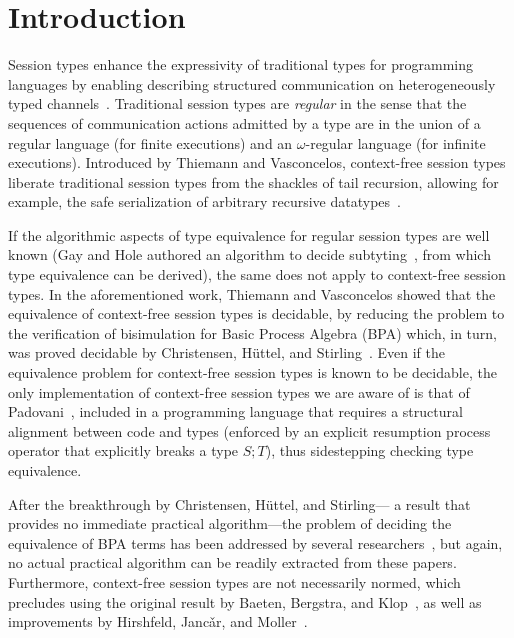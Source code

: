 \section{Introduction}
\label{sec:introduction}

Session types enhance the expressivity of traditional types for
programming languages by enabling describing structured communication
on heterogeneously typed
channels~\cite{DBLP:conf/concur/Honda93,DBLP:conf/esop/HondaVK98,DBLP:conf/parle/TakeuchiHK94}.
%
Traditional session types are \emph{regular} in the sense that the
sequences of communication actions admitted by a type are in the union
of a regular language (for finite executions) and an $\omega$-regular
language (for infinite executions).
%
Introduced by Thiemann and Vasconcelos, context-free session types
liberate traditional session types from the shackles of tail
recursion, allowing for example, the safe serialization of arbitrary
recursive datatypes~\cite{thiemann2016context}.

If the algorithmic aspects of type equivalence for regular session
types are well known (Gay and Hole authored an algorithm to decide
subtyting~\cite{DBLP:journals/acta/GayH05}, from which type
equivalence can be derived), the same does not apply to context-free
session types.
%
In the aforementioned work, Thiemann and Vasconcelos showed that the
equivalence of context-free session types is decidable, by reducing
the problem to the verification of bisimulation for Basic Process
Algebra (BPA) which, in turn, was proved decidable by Christensen,
H{\"{u}}ttel, and Stirling~\cite{DBLP:journals/iandc/ChristensenHS95}.
%
Even if the equivalence problem for context-free session types is
known to be decidable, the only implementation of context-free session
types we are aware of is that of
Padovani~\cite{DBLP:conf/esop/Padovani17}, included in a programming
language that requires a structural alignment between code and types
(enforced by an explicit resumption process operator that explicitly
breaks a type $S;T$), thus sidestepping checking type equivalence.

After the breakthrough by Christensen, H\"uttel, and Stirling--- a
result that provides no immediate practical algorithm---the problem of
deciding the equivalence of BPA terms has been addressed by several
researchers~\cite{DBLP:conf/mfcs/BurkartCS95,DBLP:journals/iandc/ChristensenHS95,janvcar1999techniques},
but again, no actual practical algorithm can be readily extracted from
these papers.
%
Furthermore, context-free session types are not necessarily normed,
which precludes using the original result by Baeten, Bergstra, and
Klop~\cite{baeten1993decidability}, as well as improvements by Hirshfeld,
Janc\v ar, and
Moller~\cite{DBLP:journals/tcs/HirshfeldJM96,DBLP:conf/concur/HirshfeldM94}.

